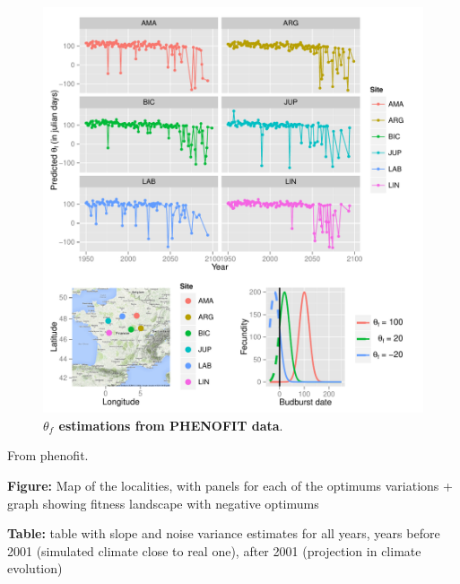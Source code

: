 \begin{figure}[ht!]
	\centering
	\label{fig:thetaf}
	\includegraphics[scale=1]{Figures/optsmaps.pdf}
	\caption{\textbf{$\theta_{f}$ estimations from PHENOFIT data}.}

\end{figure}

From phenofit.

\textbf{Figure:} Map of the localities, with panels for each of the optimums variations + graph showing fitness landscape with negative optimums

\textbf{Table:} table with slope and noise variance estimates for all years, years before 2001 (simulated climate close to real one), after 2001 (projection in climate evolution)